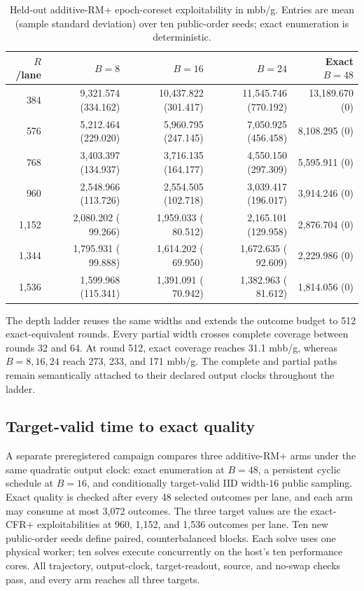 \begin{table}[h]
\caption{Held-out additive-RM+ epoch-coreset exploitability in mbb/g.  Entries
are mean (sample standard deviation) over ten public-order seeds; exact
enumeration is deterministic.}
\label{tab:app-partial-rmplus-full-grid}
\centering\small
\begin{tabular}{@{}rrrrr@{}}
\toprule
$R$/lane & $B=8$ & $B=16$ & $B=24$ & Exact $B=48$ \\
\midrule
384   & 9,321.574 (334.162) & 10,437.822 (301.417) & 11,545.746 (770.192) & 13,189.670 (0) \\
576   & 5,212.464 (229.020) &  5,960.795 (247.145) &  7,050.925 (456.458) &  8,108.295 (0) \\
768   & 3,403.397 (134.937) &  3,716.135 (164.177) &  4,550.150 (297.309) &  5,595.911 (0) \\
960   & 2,548.966 (113.726) &  2,554.505 (102.718) &  3,039.417 (196.017) &  3,914.246 (0) \\
1,152 & 2,080.202 ( 99.266) &  1,959.033 ( 80.512) &  2,165.101 (129.958) &  2,876.704 (0) \\
1,344 & 1,795.931 ( 99.888) &  1,614.202 ( 69.950) &  1,672.635 ( 92.609) &  2,229.986 (0) \\
1,536 & 1,599.968 (115.341) &  1,391.091 ( 70.942) &  1,382.963 ( 81.612) &  1,814.056 (0) \\
\bottomrule
\end{tabular}
\end{table}

The depth ladder reuses the same widths and extends the outcome budget to 512
exact-equivalent rounds.  Every partial width crosses complete coverage
between rounds 32 and 64.  At round 512, exact coverage reaches 31.1 mbb/g,
whereas $B=8,16,24$ reach 273, 233, and 171 mbb/g.  The complete and partial
paths remain semantically attached to their declared output clocks throughout
the ladder.

\subsection{Target-valid time to exact quality}
\label{app:target-valid-time}

A separate preregistered campaign compares three additive-RM+ arms under the
same quadratic output clock: exact enumeration at $B=48$, a persistent cyclic
schedule at $B=16$, and conditionally target-valid IID width-$16$ public
sampling.  Exact quality is checked after every 48 selected outcomes per lane,
and each arm may consume at most 3,072 outcomes.  The three target values are
the exact-CFR+ exploitabilities at 960, 1,152, and 1,536 outcomes per lane.
Ten new public-order seeds define paired, counterbalanced blocks.  Each solve
uses one physical worker; ten solves execute concurrently on the host's ten
performance cores.  All trajectory, output-clock, target-readout, source, and
no-swap checks pass, and every arm reaches all three targets.

